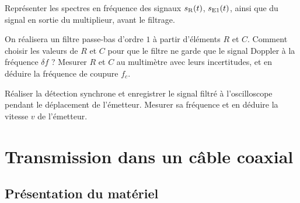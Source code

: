 \begin{protocole}
\item Représenter les spectres en fréquence des signaux $s_{\rm R}(t)$, $s_{\rm E1}(t)$, ainsi que du signal en sortie du multiplieur, avant le filtrage.
\item On réalisera un filtre passe-bas d'ordre $1$ à partir d’éléments $R$ et $C$. Comment choisir les valeurs de $R$ et $C$ pour que le filtre ne garde que le signal Doppler à la fréquence $\delta f$ ? Mesurer $R$ et $C$ au multimètre avec leurs incertitudes, et en déduire la fréquence de coupure $f_c$.

\item Réaliser la détection synchrone et enregistrer le signal filtré à l’oscilloscope pendant le déplacement de l’émetteur. Mesurer sa fréquence et en déduire la vitesse $v$ de l’émetteur.

 \end{protocole}






\section{Transmission dans un câble coaxial}

 \subsection{Présentation du matériel}



